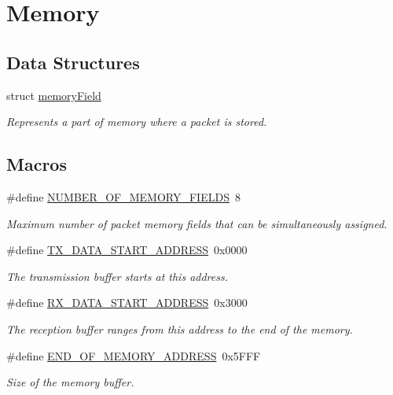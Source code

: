 \hypertarget{group__memory}{}\section{Memory}
\label{group__memory}
\subsection*{Data Structures}
\begin{DoxyCompactItemize}
\item 
struct \mbox{\hyperlink{structmemory_field}{memory\+Field}}
\begin{DoxyCompactList}\small\item\em Represents a part of memory where a packet is stored. \end{DoxyCompactList}\end{DoxyCompactItemize}
\subsection*{Macros}
\begin{DoxyCompactItemize}
\item 
\#define \mbox{\hyperlink{group__memory_ga31efd827f5e76320608065c79fc29e00}{N\+U\+M\+B\+E\+R\+\_\+\+O\+F\+\_\+\+M\+E\+M\+O\+R\+Y\+\_\+\+F\+I\+E\+L\+DS}}~8
\begin{DoxyCompactList}\small\item\em Maximum number of packet memory fields that can be simultaneously assigned. \end{DoxyCompactList}\item 
\#define \mbox{\hyperlink{group__memory_gaf952470b2ca20106b4998e400ac4236e}{T\+X\+\_\+\+D\+A\+T\+A\+\_\+\+S\+T\+A\+R\+T\+\_\+\+A\+D\+D\+R\+E\+SS}}~0x0000
\begin{DoxyCompactList}\small\item\em The transmission buffer starts at this address. \end{DoxyCompactList}\item 
\#define \mbox{\hyperlink{group__memory_gab75619e07ad50e2b4b78684bd3dc81df}{R\+X\+\_\+\+D\+A\+T\+A\+\_\+\+S\+T\+A\+R\+T\+\_\+\+A\+D\+D\+R\+E\+SS}}~0x3000
\begin{DoxyCompactList}\small\item\em The reception buffer ranges from this address to the end of the memory. \end{DoxyCompactList}\item 
\#define \mbox{\hyperlink{group__memory_gad2770fc418de68b3967d98142954405a}{E\+N\+D\+\_\+\+O\+F\+\_\+\+M\+E\+M\+O\+R\+Y\+\_\+\+A\+D\+D\+R\+E\+SS}}~0x5\+F\+FF
\begin{DoxyCompactList}\small\item\em Size of the memory buffer. \end{DoxyCompactList}\end{DoxyCompactItemize}
